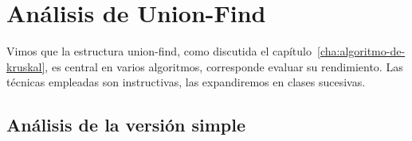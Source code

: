 

\chapter{Análisis de Union-Find}
\label{cha:analisis-de-union-find}

  Vimos que la estructura union-find,
  como discutida el capítulo~\ref{cha:algoritmo-de-kruskal},
  es central en varios algoritmos,
  corresponde evaluar su rendimiento.
  Las técnicas empleadas son instructivas,
  las expandiremos en clases sucesivas.

\section{Análisis de la versión simple}
\label{sec:union-find-analisys-simple}

